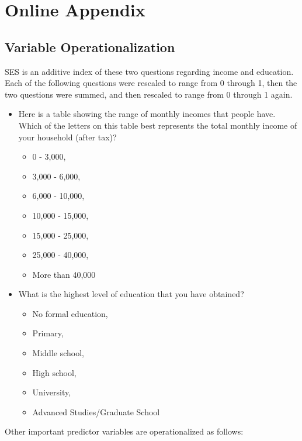 \documentclass[
  letterpaper,
  DIV=11,
  numbers=noendperiod]{scrartcl}
\begin{document}
\newpage{}

\section{Online Appendix}\label{online-appendix}

\subsection{Variable
Operationalization}\label{variable-operationalization}

SES is an additive index of these two questions regarding income and
education. Each of the following questions were rescaled to range from 0
through 1, then the two questions were summed, and then rescaled to
range from 0 through 1 again.

\begin{itemize}
\item
  Here is a table showing the range of monthly incomes that people have.
  Which of the letters on this table best represents the total monthly
  income of your household (after tax)?

  \begin{itemize}
  \item
    0 - 3,000,
  \item
    3,000 - 6,000,
  \item
    6,000 - 10,000,
  \item
    10,000 - 15,000,
  \item
    15,000 - 25,000,
  \item
    25,000 - 40,000,
  \item
    More than 40,000
  \end{itemize}
\item
  What is the highest level of education that you have obtained?

  \begin{itemize}
  \item
    No formal education,
  \item
    Primary,
  \item
    Middle school,
  \item
    High school,
  \item
    University,
  \item
    Advanced Studies/Graduate School
  \end{itemize}
\end{itemize}

Other important predictor variables are operationalized as follows:
\end{document}
